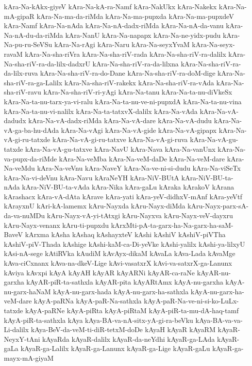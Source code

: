 {kAra-Na-kAkx-giyeV
kAra-Na-kA-ra-Namf
kAra-NakUkx
kAra-Nakekx
kAra-Na-mA-gipaR
kAra-Na-ma-da-riMda
kAra-Na-ma-pupxda
kAra-Na-ma-pupxdeV
kAra-Namf
kAra-Na-nAda
kAra-Na-nA-dadx-riMda
kAra-Na-nA-da-vanu
kAra-Na-nA-du-da-riMda
kAra-NanU
kAra-Na-napapx
kAra-Na-ne-yidx-pudu
kAra-Na-pu-ru-SeVSu
kAra-Na-rAgi
kAra-Naru
kAra-Na-seyxYvaM
kAra-Na-seyx-ravaM
kAra-Na-sha-riVra
kAra-Na-sha-riV-rada
kAra-Na-sha-riV-ra-dalilx
kAra-Na-sha-riV-ra-da-lilx-dadxrU
kAra-Na-sha-riV-ra-da-lilxna
kAra-Na-sha-riV-ra-da-lilx-ruva
kAra-Na-sha-riV-ra-do-Dane
kAra-Na-sha-riV-ra-doM-dige
kAra-Na-sha-riV-ra-ga-Lalilx
kAra-Na-sha-riV-rakekx
kAra-Na-sha-riV-ra-vAda
kAra-Na-sha-riV-ravu
kAra-Na-sha-riV-ri-yAgi
kAra-Na-tanu
kAra-Na-ta-nu-diVkeSx
kAra-Na-ta-nu-tarx-ya-vi-ralu
kAra-Na-ta-nu-ve-ni-pupxdA
kAra-Na-ta-nu-vina
kAra-Na-ta-nu-vi-nalilx
kAra-Na-ta-tatxvX-dalilx
kAra-Na-vAda
kAra-Na-vA-dadudx
kAra-Na-vA-dadx-riMda
kAra-Na-vA-dare
kAra-Na-vA-dudu
kAra-Na-vA-ga-ba-hu-dAda
kAra-Na-vAgi
kAra-Na-vA-gide
kAra-Na-vA-gipapx
kAra-Na-vA-gi-ru-tatxde
kAra-Na-vA-gi-ru-tatxve
kAra-Na-vA-gi-ruva
kAra-Na-vA-gu-tatxde
kAra-Na-vA-gu-tatxve
kAra-NavU
kAra-Nava
kAra-Na-vanUnx
kAra-Na-va-pupx-da-riMde
kAra-Na-veMba
kAra-Na-veM-daDe
kAra-Na-veM-dare
kAra-Na-veMdu
kAra-Na-veVnu
kAra-NaveY
kAra-Na-ve-ni-si-dudu
kAra-Na-viSeTx
kAra-Na-vi-deVnu
kAra-Navu
kAraNeYH
kAra-NiV-BUtA
kAra-NiV-BU-ta-nAda
kAra-NiV-BU-ta-vAda
kAra-Nika
kAra-gaLu
kAraka
kArakoV
kArana
kArashacx
kAra-vA-dAta
kArave
kAra-yati
kAra-yeV-didhxV-mAnf
kAra-yeVtf
kArayxnU
kAri-kA-lamemx
kAru-Nayxda
kAru-Nayx-diMda
kAru-Nayx-parx-sA-da-va-nuMDu
kAru-Nayx-vA-yi-tAtxgi
kAru-Nayxva
kAru-Nayx-veV-dayxru
kAru-Nayx-venanx
kAru-ti-pupxdu
kArxMti-pA-ta-garx-ha-Na-garx-ha-saM-BaveV
kArxma
kAsha
kAshaq
kAshayxteV
kAshi
kAshiV
kAshiV-piVTha
kAshiV-piV-Thada
kAshige
kAshi-kaM-ca-Di-yeVke
kAshi-yalilx
kAshi-ya-lilxyU
kAsi-nA-sege
kAtiRVka
kAudiM
kAvAyx-dikaM
kAvaLa
kAva-Lada
kAvaMge
kAva-ciCxnanx
kAva-na-dkeV-Lige
kAvi-vasatxrX
kAvi-va-satxrX-ga-Lanunx
kAviya
kAvxpi
kAyA
kAyAH
kAyAR
kAyARNi
kAyAR-ca-raNe
kAyAR-nu-garxha
kAyAR-piR-ta-sathxla
kAyAR-pita
kAyARtAmx
kAyA-nu-garxha
kAyA-nu-garx-haNaM
kAyA-nu-garx-hada
kAyA-nu-garx-ha-sathxla
kAyA-nu-garx-ha-veM-dare
kAyA-paRNa
kAyA-paR-Na-sathxla
kAyA-paR-Na-ve-ni-si-ko-LuLx-tatxde
kAyA-paRNe
kAyA-piRta
kAyA-piRtaM
kAyA-piR-ta-mu-dA-haq-tamf
kAyA-piR-ta-sathxla
kAya
kAya-BA-va-nA-sitx-yA-gi-ra-beVku
kAya-BA-va-va-Li-dalilx
kAya-BeV-da-veM-ti-diR-tetxM-doDe
kAyaH
kAyaR
kAyaRM
kAyaR-NeyxY-tAni
kAyaRda
kAyaR-dalilx
kAyaR-da-neYdhi
kAyaR-ga-LAda
kAyaR-gaLa
kAyaR-ga-Lalilx
kAyaR-ga-Lanunx
kAyaR-ga-Lige
kAyaR-gaLu
kAyaR-ga-mayx-mA-giyaM
}
